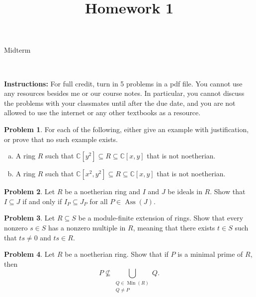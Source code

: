 \documentclass[11pt]{article}
\title{}
\date{\vspace{-0.5in}}
\title{Homework 1}
\DeclareMathOperator{\Ass}{Ass}
\DeclareMathOperator{\Min}{Min}
\theoremstyle{definition}
\newtheorem{problem}{Problem}
\begin{document}
\thispagestyle{fancy}
\pagestyle{fancy}

\vspace{3em}

\begin{center}
	{\LARGE Midterm}
\end{center}

\

\noindent
{\bf Instructions:}
For full credit, turn in 5 problems in a pdf file. 
You cannot use any resources besides me or our course notes. In particular, you cannot discuss the problems with your classmates until after the due date, and you are not allowed to use the internet or any other textbooks as a resource.


\vspace{2em}



\begin{problem}
	For each of the following, either give an example with justification, or prove that no such example exists.
	\begin{enumerate}[a)]
		\item A ring $R$ such that $\mathbb{C}[y^2] \subseteq R \subseteq \mathbb{C}[x,y]$ that is not noetherian.
		\item A ring $R$ such that $\mathbb{C}[x^2,y^2] \subseteq R \subseteq \mathbb{C}[x,y]$ that is not noetherian.
	\end{enumerate}
\end{problem}


\vfill

\begin{problem}
	Let $R$ be a noetherian ring and $I$ and $J$ be ideals in $R$. Show that $I \subseteq J$ if and only if $I_P \subseteq J_P$ for all $P \in \Ass(J)$.
\end{problem}


\vfill

\begin{problem}
	Let $R \subseteq S$ be a module-finite extension of rings. Show that every nonzero $s \in S$ has a nonzero multiple in $R$, meaning that there exists $t \in S$ such that $ts \neq 0$ and $ts \in R$.
\end{problem}



\vfill

\begin{problem}
	Let $R$ be a noetherian ring. Show that if $P$ is a minimal prime of $R$, then
	$$P \nsubseteq \bigcup_{\substack{Q \in \Min(R) \\ Q \neq P}} Q.$$
\end{problem}
\end{document}
